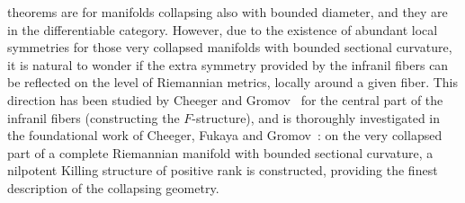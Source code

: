 \documentclass[pdftex]{sigma}
\numberwithin{equation}{section}
\begin{document}
theorems are for manifolds collapsing also with bounded diameter, and they are
in the differentiable category. However, due to the existence of abundant local
symmetries for those very collapsed manifolds with bounded sectional curvature,
it is natural to wonder if the extra symmetry provided by the infranil fibers
can be reflected on the level of Riemannian metrics, locally around a given
fiber. This direction has been studied by Cheeger and Gromov~\cite{CGI, CGII}
for the central part of the infranil fibers (constructing the $F$-structure),
and is thoroughly investigated in the foundational work of Cheeger, Fukaya and
Gromov~\cite{CFG92}: on the very collapsed part of a complete Riemannian
manifold with bounded sectional curvature, a nilpotent Killing structure of
positive rank is constructed, providing the finest description of the
collapsing geometry.
\end{document}
